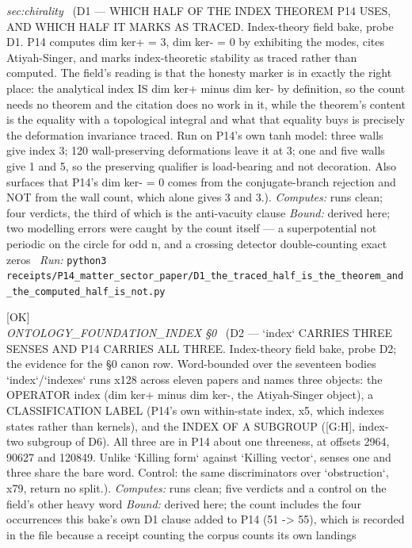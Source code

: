 \begin{description}
\textit{sec:chirality} \ (D1 --- WHICH HALF OF THE INDEX THEOREM P14 USES, AND WHICH HALF IT MARKS AS TRACED. Index-theory field bake, probe D1. P14 computes dim ker+ = 3, dim ker- = 0 by exhibiting the modes, cites Atiyah-Singer, and marks index-theoretic stability as traced rather than computed. The field's reading is that the honesty marker is in exactly the right place: the analytical index IS dim ker+ minus dim ker- by definition, so the count needs no theorem and the citation does no work in it, while the theorem's content is the equality with a topological integral and what that equality buys is precisely the deformation invariance traced. Run on P14's own tanh model: three walls give index 3; 120 wall-preserving deformations leave it at 3; one and five walls give 1 and 5, so the preserving qualifier is load-bearing and not decoration. Also surfaces that P14's dim ker- = 0 comes from the conjugate-branch rejection and NOT from the wall count, which alone gives 3 and 3.). 
\emph{Computes:} runs clean; four verdicts, the third of which is the anti-vacuity clause
 \emph{Bound:} derived here; two modelling errors were caught by the count itself --- a superpotential not periodic on the circle for odd n, and a crossing detector double-counting exact zeros
\ \emph{Run:} \texttt{python3 receipts/P14\_matter\_sector\_paper/D1\_the\_traced\_half\_is\_the\_theorem\_and\_the\_computed\_half\_is\_not.py}
\item[\label{rcpt:D2_index_carries_three_senses_inside_one_paper}\texttt{D2\_index\_carries\_three\_senses\_inside\_one\_paper}]\hfill\textsf{[OK]}\\
\textit{ONTOLOGY\_FOUNDATION\_INDEX \S{}0} \ (D2 --- `index` CARRIES THREE SENSES AND P14 CARRIES ALL THREE. Index-theory field bake, probe D2; the evidence for the \S{}0 canon row. Word-bounded over the seventeen bodies `index`/`indexes` runs x128 across eleven papers and names three objects: the OPERATOR index (dim ker+ minus dim ker-, the Atiyah-Singer object), a CLASSIFICATION LABEL (P14's own within-state index, x5, which indexes states rather than kernels), and the INDEX OF A SUBGROUP ([G:H], index-two subgroup of D6). All three are in P14 about one threeness, at offsets 2964, 90627 and 120849. Unlike `Killing form` against `Killing vector`, senses one and three share the bare word. Control: the same discriminators over `obstruction`, x79, return no split.). 
\emph{Computes:} runs clean; five verdicts and a control on the field's other heavy word
 \emph{Bound:} derived here; the count includes the four occurrences this bake's own D1 clause added to P14 (51 -> 55), which is recorded in the file because a receipt counting the corpus counts its own landings

\end{description}
